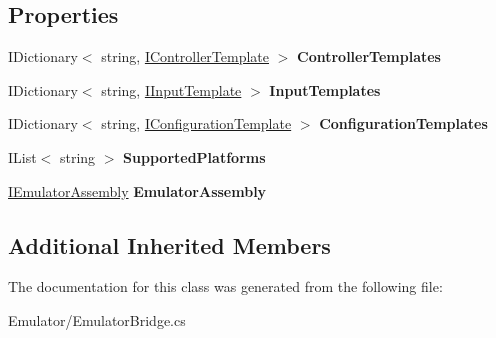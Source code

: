 \subsection*{Properties}
\begin{DoxyCompactItemize}
\item 
\hypertarget{class_snowflake_1_1_emulator_1_1_emulator_bridge_a36a0729805c8a6f4310be623a8aac378}{}I\+Dictionary$<$ string, \hyperlink{interface_snowflake_1_1_emulator_1_1_input_1_1_i_controller_template}{I\+Controller\+Template} $>$ {\bfseries Controller\+Templates}\label{class_snowflake_1_1_emulator_1_1_emulator_bridge_a36a0729805c8a6f4310be623a8aac378}

\item 
\hypertarget{class_snowflake_1_1_emulator_1_1_emulator_bridge_ad9edcddfd91354fa25ce8d533bbec4fe}{}I\+Dictionary$<$ string, \hyperlink{interface_snowflake_1_1_emulator_1_1_input_1_1_i_input_template}{I\+Input\+Template} $>$ {\bfseries Input\+Templates}\label{class_snowflake_1_1_emulator_1_1_emulator_bridge_ad9edcddfd91354fa25ce8d533bbec4fe}

\item 
\hypertarget{class_snowflake_1_1_emulator_1_1_emulator_bridge_a0831dcad2a39ac6b776a93bc9a90170f}{}I\+Dictionary$<$ string, \hyperlink{interface_snowflake_1_1_emulator_1_1_configuration_1_1_i_configuration_template}{I\+Configuration\+Template} $>$ {\bfseries Configuration\+Templates}\label{class_snowflake_1_1_emulator_1_1_emulator_bridge_a0831dcad2a39ac6b776a93bc9a90170f}

\item 
\hypertarget{class_snowflake_1_1_emulator_1_1_emulator_bridge_aeb94bd38fdc783239fe507d9ab644d3f}{}I\+List$<$ string $>$ {\bfseries Supported\+Platforms}\label{class_snowflake_1_1_emulator_1_1_emulator_bridge_aeb94bd38fdc783239fe507d9ab644d3f}

\item 
\hypertarget{class_snowflake_1_1_emulator_1_1_emulator_bridge_a0390fcb8d486e087e8ef41b59d3bd491}{}\hyperlink{interface_snowflake_1_1_emulator_1_1_i_emulator_assembly}{I\+Emulator\+Assembly} {\bfseries Emulator\+Assembly}\label{class_snowflake_1_1_emulator_1_1_emulator_bridge_a0390fcb8d486e087e8ef41b59d3bd491}

\end{DoxyCompactItemize}
\subsection*{Additional Inherited Members}


The documentation for this class was generated from the following file\+:\begin{DoxyCompactItemize}
\item 
Emulator/Emulator\+Bridge.\+cs\end{DoxyCompactItemize}
